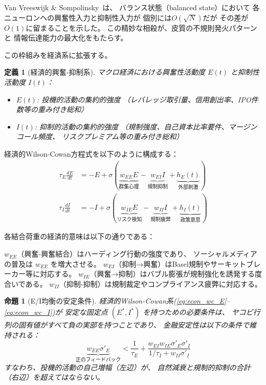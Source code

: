 \documentclass[12pt,twocolumn]{ltjsarticle}
\newtheorem{proposition}[theorem]{命題}
\newtheorem{definition}{定義}
\begin{document}
Van Vreeswijk \& Sompolinsky~\cite{VanVreeswijk1996}は、
バランス状態（balanced state）において
各ニューロンへの興奮性入力と抑制性入力が
個別には$O(\sqrt{N})$だが
その差が$O(1)$に留まることを示した。
この精妙な相殺が、皮質の不規則発火パターンと
情報伝達能力の最大化をもたらす。

この枠組みを経済系に拡張する。

\begin{definition}[経済的興奮-抑制系]
マクロ経済における興奮性活動度 $E(t)$ と抑制性活動度 $I(t)$：
\begin{itemize}
\item $E(t)$: 投機的活動の集約的強度
（レバレッジ取引量、信用創出率、IPO件数等の重み付き総和）
\item $I(t)$: 抑制的活動の集約的強度
（規制強度、自己資本比率要件、マージンコール頻度、
リスクプレミアム等の重み付き総和）
\end{itemize}
\end{definition}

経済的Wilson-Cowan方程式を以下のように構成する：
\begin{align}
\tau_E \frac{dE}{dt} &= -E + \sigma\!\left(
  \underbrace{w_{EE} E}_{\text{群集心理}} -
  \underbrace{w_{EI} I}_{\text{規制抑制}} +
  \underbrace{h_E(t)}_{\text{外部刺激}}
\right) \label{eq:econ_wc_E} \\
\tau_I \frac{dI}{dt} &= -I + \sigma\!\left(
  \underbrace{w_{IE} E}_{\text{リスク検知}} -
  \underbrace{w_{II} I}_{\text{規制疲弊}} +
  \underbrace{h_I(t)}_{\text{政策意思}}
\right) \label{eq:econ_wc_I}
\end{align}

各結合荷重の経済的意味は以下の通りである：

$w_{EE}$（興奮-興奮結合）はハーディング行動の強度であり、
ソーシャルメディアの普及は $w_{EE}$ を増大させる。
$w_{EI}$（抑制→興奮）はBasel規制やサーキットブレーカー等に対応する。
$w_{IE}$（興奮→抑制）はバブル膨張が規制強化を誘発する度合いである。
$w_{II}$（抑制-抑制）は規制裁定やコンプライアンス疲弊に対応する。

\begin{proposition}[E/I均衡の安定条件]
\label{prop:ei_stability}
経済的Wilson-Cowan系(\ref{eq:econ_wc_E}--\ref{eq:econ_wc_I})が
安定な固定点 $(E^*, I^*)$ を持つための必要条件は、
ヤコビ行列の固有値がすべて負の実部を持つことであり、
金融安定性は以下の条件で維持される：
\begin{equation}
\underbrace{w_{EE} \sigma'_E}_{\text{正のフィードバック}} <
\frac{1}{\tau_E} +
\frac{w_{EI} w_{IE} \sigma'_E \sigma'_I}
{1/\tau_I + w_{II} \sigma'_I}
\label{eq:stability_condition}
\end{equation}
すなわち、投機的活動の自己増幅（左辺）が、
自然減衰と規制的抑制の合計（右辺）を超えてはならない。
\end{proposition}
\end{document}
